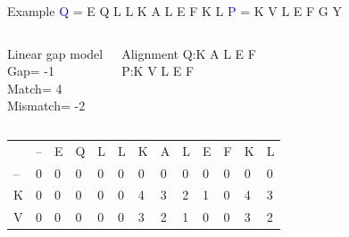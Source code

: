 \documentclass{bredelebeamer}
\begin{document}
\begin{frame}{Example}
 \centering
 \textcolor{blue}{Q} = E Q L L K A L E F K L \quad \textcolor{blue}{P} = K V L E F G Y
\begin{columns}
\begin{block}{Linear gap model} \\
Gap= -1 \\
Match= 4 \\
Mismatch= -2
\end{block}
\begin{block}{Alignment}
Q:\quad K A L E F \\
P:\quad K V L E F
\end{block}
\end{columns}
\begin{table}[]
\centering
\begin{tabular}{*{13}{p{0.4cm}}}
                        & --                     & E                      & Q                      & L                      & L                                              & K                                              & A                                              & L                                              & E                                               & F                                               & K                       & L                       \\ \cline{2-13} 
\multicolumn{1}{l|}{--} & \multicolumn{1}{l|}{0} & \multicolumn{1}{l|}{0} & \multicolumn{1}{l|}{0} & \multicolumn{1}{l|}{0} &  \multicolumn{1}{l|}{\cellcolor[HTML]{3166FF}0} & \multicolumn{1}{l|}{0}                         & \multicolumn{1}{l|}{0}                         & \multicolumn{1}{l|}{0}                         & \multicolumn{1}{l|}{0}                          & \multicolumn{1}{l|}{0}                          & \multicolumn{1}{l|}{0}  & \multicolumn{1}{l|}{0}  \\ \cline{2-13} 
\multicolumn{1}{l|}{K}  & \multicolumn{1}{l|}{0} & \multicolumn{1}{l|}{0} & \multicolumn{1}{l|}{0} & \multicolumn{1}{l|}{0} & \multicolumn{1}{l|}{0}                         &\multicolumn{1}{l|}{\cellcolor[HTML]{3166FF}4} & \multicolumn{1}{l|}{3} & \multicolumn{1}{l|}{2}                         & \multicolumn{1}{l|}{1}                          & \multicolumn{1}{l|}{0}                          & \multicolumn{1}{l|}{4}  & \multicolumn{1}{l|}{3}  \\ \cline{2-13} 
\multicolumn{1}{l|}{V}  & \multicolumn{1}{l|}{0} & \multicolumn{1}{l|}{0} & \multicolumn{1}{l|}{0} & \multicolumn{1}{l|}{0} & \multicolumn{1}{l|}{0}                         & \multicolumn{1}{l|}{3} & \multicolumn{1}{l|}{\cellcolor[HTML]{3166FF}2} & \multicolumn{1}{l|}{1}                         & \multicolumn{1}{l|}{0}                          & \multicolumn{1}{l|}{0}                          & \multicolumn{1}{l|}{3}  & \multicolumn{1}{l|}{2}  \\ \cline{2-13} %

\end{tabular}
\end{table}
\end{frame}
\end{document}
